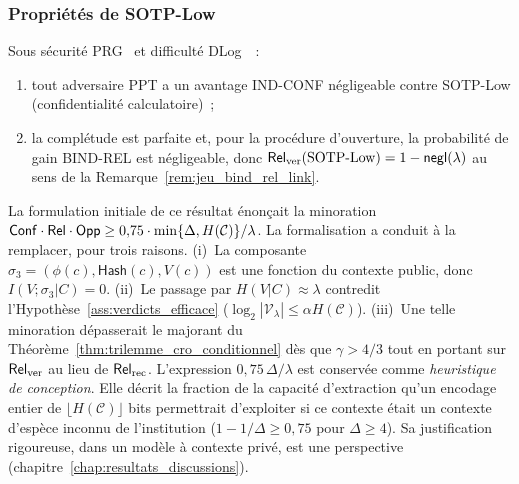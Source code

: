\begin{sloppypar}
\subsubsection{Propri\'et\'es de SOTP-Low}
\label{subsubsec:saturation_low}

\begin{proposition}\label{thm:saturation_sotp_low}
Sous s\'ecurit\'e PRG~\cite{BlumMicali84,Yao82} et difficult\'e DLog~\cite{DiffieHellman76}~:
\begin{enumerate}
\item tout adversaire PPT a un avantage IND-CONF n\'egligeable contre SOTP-Low
      (confidentialit\'e calculatoire)~;
\item la compl\'etude est parfaite et, pour la proc\'edure d'ouverture,
      la probabilit\'e de gain BIND-REL est n\'egligeable, donc
      $\mathsf{Rel}_{\mathrm{ver}}(\mathrm{SOTP\text{-}Low}) = 1 - \mathsf{negl}(\lambda)$ au sens de la
      Remarque~\ref{rem:jeu_bind_rel_link}.
\end{enumerate}
\end{proposition}

\begin{remark}
\label{rem:facteur_limitant_low}
La formulation initiale de ce r\'esultat \'enon\c{c}ait la minoration
$\mathsf{Conf} \cdot \mathsf{Rel} \cdot \mathsf{Opp} \geq 0{,}75 \cdot \min\{\Delta, H(\mathcal{C})\}/\lambda$.
La formalisation a conduit \`a la remplacer, pour trois raisons. (i)~La composante $\sigma_3 = (\phi(c), \mathsf{Hash}(c), V(c))$
est une fonction du contexte public, donc $I(V;\sigma_3|C) = 0$. (ii)~Le passage
par $H(V|C) \approx \lambda$ contredit l'Hypoth\`ese~\ref{ass:verdicts_efficace}
($\log_2|\mathcal{V}_\lambda| \leq \alpha H(\mathcal{C})$). (iii)~Une telle minoration
d\'epasserait le majorant du Th\'eor\`eme~\ref{thm:trilemme_cro_conditionnel} d\`es
que $\gamma > 4/3$ tout en portant sur $\mathsf{Rel}_{\mathrm{ver}}$ au lieu de $\mathsf{Rel}_{\mathrm{rec}}$. L'expression
$0{,}75\,\Delta/\lambda$ est conserv\'ee comme \emph{heuristique de conception}.
Elle d\'ecrit la fraction de la capacit\'e d'extraction qu'un encodage entier de
$\lfloor H(\mathcal{C}) \rfloor$ bits permettrait d'exploiter si ce contexte
\'etait un contexte d'esp\`ece inconnu de l'institution ($1 - 1/\Delta \geq 0{,}75$
pour $\Delta \geq 4$). Sa justification rigoureuse, dans un mod\`ele \`a contexte
priv\'e, est une perspective (chapitre~\ref{chap:resultats_discussions}).
\end{remark}


\end{sloppypar}
